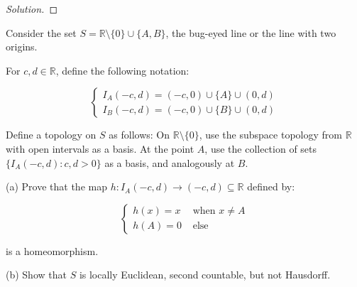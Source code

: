 \documentclass[10pt]{article}
\newenvironment{problem}[2][]{\begin{trivlist}
\item[\hskip \labelsep {\bfseries #1}\hskip \labelsep {\bfseries #2.}]}{\end{trivlist}}
\begin{document}
\begin{proof}[Solution]



\end{proof}

\begin{problem}{Question 5}

Consider the set $S = \mathbb{R} \setminus \{ 0 \} \cup \{ A, B \}$, the bug-eyed line or the line with two origins.

For $c,d \in \mathbb{R}$, define the following notation:

$$ \begin{cases} I_A(-c, d) = (-c, 0) \cup \{ A \} \cup (0, d) \\  I_B(-c, d) = (-c, 0) \cup \{ B \} \cup (0, d) \end{cases} $$

Define a topology on $S$ as follows: On $\mathbb{R} \setminus \{ 0 \}$, use the subspace topology from $\mathbb{R}$ with open intervals as a basis. At the point $A$, use the collection of sets $\{ I_A(-c, d) : c,d  > 0 \}$ as a basis, and analogously at $B$.

(a) Prove that the map $h: I_A(-c,d) \to (-c, d) \subseteq \mathbb{R}$ defined by:

$$ \begin{cases} h(x) = x & \text{ when } x \not = A \\ h(A) = 0 & \text{ else } \end{cases} $$

 is a homeomorphism.

(b) Show that $S$ is locally Euclidean, second countable, but not Hausdorff.

\end{problem}
\end{document}
